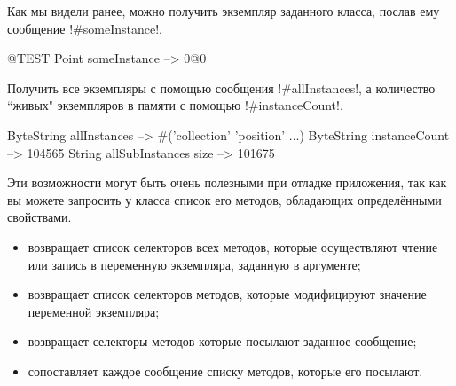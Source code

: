 \documentclass[a4paper,10pt,twoside]{book}
\begin{document}
Как мы видели ранее, можно получить экземпляр заданного класса, послав ему сообщение \ct!#someInstance!.
\begin{code}{@TEST} %
Point someInstance --> 0@0
\end{code}

Получить все экземпляры с помощью сообщения \ct!#allInstances!, а количество ``живых" экземпляров в памяти с помощью \ct!#instanceCount!.
\begin{code}{} %
ByteString allInstances        --> #('collection' 'position'  ...)
ByteString instanceCount    --> 104565
String allSubInstances size -->  101675
\end{code}

Эти возможности  могут быть очень полезными при отладке приложения, так как вы можете запросить у класса список его методов, обладающих определёнными свойствами.
\begin{itemize}
\item {} возвращает список селекторов всех методов, которые осуществляют чтение или запись в переменную экземпляра, заданную в аргументе;
\item {} возвращает список селекторов методов, которые модифицируют значение переменной экземпляра;
\item {} возвращает селекторы методов которые посылают заданное сообщение;
\item {} сопоставляет каждое сообщение списку методов, которые его посылают.
\end{itemize}
\end{document}
